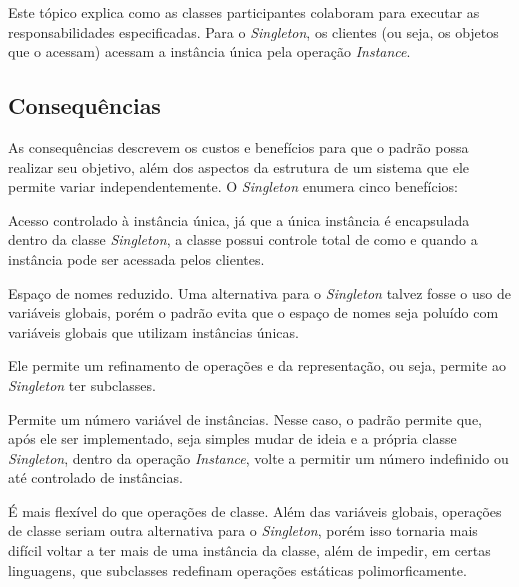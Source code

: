 Este tópico explica como as classes participantes 
colaboram para executar as responsabilidades 
especificadas. Para o \textit{Singleton}, os clientes (ou seja, 
os objetos que o acessam) acessam a instância única 
pela operação \textit{Instance}.

\subsection*{Consequências}

As consequências descrevem os custos e benefícios para 
que o padrão possa realizar seu objetivo, além dos 
aspectos da estrutura de um sistema que ele permite variar 
independentemente. O \textit{Singleton} enumera cinco benefícios:

\begin{alineas}
    \item Acesso controlado à instância única, já que 
    a única instância é encapsulada dentro da classe 
    \textit{Singleton}, a classe possui controle total de como e quando 
    a instância pode ser acessada pelos clientes.

    \item Espaço de nomes reduzido. Uma alternativa 
    para o \textit{Singleton} talvez fosse o uso de variáveis 
    globais, porém o padrão evita que o espaço de nomes 
    seja poluído com variáveis globais que utilizam 
    instâncias únicas.

    \item Ele permite um refinamento de operações e da 
    representação, ou seja, permite ao \textit{Singleton} ter 
    subclasses.

    \item Permite um número variável de instâncias. Nesse 
    caso, o padrão permite que, após ele ser implementado, 
    seja simples mudar de ideia e a própria classe \textit{Singleton}, 
    dentro da operação \textit{Instance}, volte a permitir um número 
    indefinido ou até controlado de instâncias.

    \item É mais flexível do que operações de classe. Além 
    das variáveis globais, operações de classe seriam outra 
    alternativa para o \textit{Singleton}, porém isso tornaria mais 
    difícil voltar a ter mais de uma instância da classe, 
    além de impedir, em certas linguagens, que subclasses 
    redefinam operações estáticas polimorficamente.

\end{alineas}

